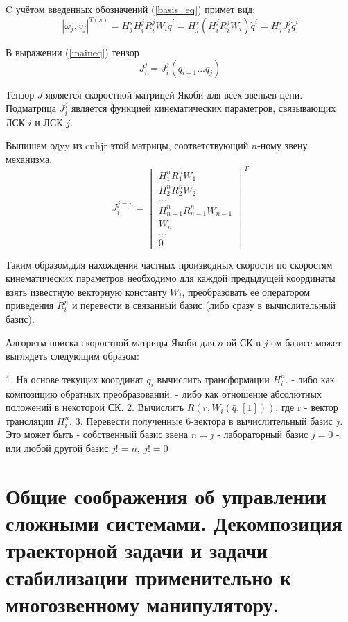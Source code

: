 \documentclass[12pt,a4paper,titlepage]{article}
\begin{document}
C учётом введенных обозначений (\ref{basis_eq}) примет вид:
\begin{equation}\label{maineq}
|\omega_j, v_j|^{T(s)} = H^s_j H^j_i R^j_i W_i \dot{q}^i = H^s_j (H^j_i R^j_i W_i) \dot{q}^i = H^s_j J^{j}_i \dot{q}^i
\end{equation}

В выражении (\ref{maineq}) тензор 
\begin{equation}\label{}
J_i^j = J_i^j(q_{i+1}...q_j)
\end{equation} 

Тензор $J$ является скоростной матрицей Якоби для всех звеньев цепи. Подматрица $J^j_i$ является функцией кинематических параметров, связывающих ЛСК $i$ и ЛСК $j$.

Выпишем одyy из cnhjr этой матрицы, соответствующий $n$-ному звену механизма.
\begin{equation}\label{}
J_i^{j=n} =  
\begin{vmatrix}
H^n_1R^n_1W_1 \\
H^n_2R^n_2W_2 \\
... \\
H^n_{n-1}R^n_{n-1}W_{n-1} \\
W_{n} \\
... \\
0
\end{vmatrix}^T
\end{equation}

Таким образом,для нахождения частных производных скорости по скоростям кинематических параметров необходимо для каждой предыдущей координаты взять известную векторную константу $W_i$, преобразовать её оператором приведения $R^n_i$ и перевести в связанный базис (либо сразу в вычислительный базис). 

Алгоритм поиска скоростной матрицы Якоби для $n$-ой СК в $j$-ом базисе может выглядеть следующим образом:

1. На основе текущих координат $q_i$ вычислить трансформации $H^n_i$.
	- либо как композицию обратных преобразований,
	- либо как отношение абсолютных положений в некоторой СК. 
2. Вычислить $R(r, W_i(\bar{q},[1]))$, где r - вектор трансляции $H^n_i$.
3. Перевести полученные 6-вектора в вычислительный базис $j$. Это может быть 
	- собственный базис звена $n = j$
	- лабораторный базис $j = 0$
	- или любой другой базис $j != n,\ j != 0$

\newpage
\section{Общие соображения об управлении сложными системами. Декомпозиция траекторной задачи и задачи стабилизации применительно к многозвенному манипулятору.}
\end{document}
